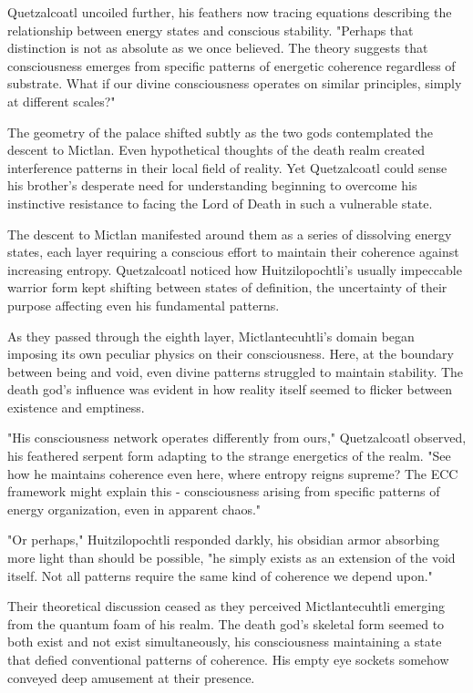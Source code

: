 Quetzalcoatl uncoiled further, his feathers now tracing equations describing the relationship between energy states and conscious stability. "Perhaps that distinction is not as absolute as we once believed. The theory suggests that consciousness emerges from specific patterns of energetic coherence regardless of substrate. What if our divine consciousness operates on similar principles, simply at different scales?"

The geometry of the palace shifted subtly as the two gods contemplated the descent to Mictlan. Even hypothetical thoughts of the death realm created interference patterns in their local field of reality. Yet Quetzalcoatl could sense his brother's desperate need for understanding beginning to overcome his instinctive resistance to facing the Lord of Death in such a vulnerable state.

The descent to Mictlan manifested around them as a series of dissolving energy states, each layer requiring a conscious effort to maintain their coherence against increasing entropy. Quetzalcoatl noticed how Huitzilopochtli's usually impeccable warrior form kept shifting between states of definition, the uncertainty of their purpose affecting even his fundamental patterns.

As they passed through the eighth layer, Mictlantecuhtli's domain began imposing its own peculiar physics on their consciousness. Here, at the boundary between being and void, even divine patterns struggled to maintain stability. The death god's influence was evident in how reality itself seemed to flicker between existence and emptiness.

"His consciousness network operates differently from ours," Quetzalcoatl observed, his feathered serpent form adapting to the strange energetics of the realm. "See how he maintains coherence even here, where entropy reigns supreme? The ECC framework might explain this - consciousness arising from specific patterns of energy organization, even in apparent chaos."

"Or perhaps," Huitzilopochtli responded darkly, his obsidian armor absorbing more light than should be possible, "he simply exists as an extension of the void itself. Not all patterns require the same kind of coherence we depend upon."

Their theoretical discussion ceased as they perceived Mictlantecuhtli emerging from the quantum foam of his realm. The death god's skeletal form seemed to both exist and not exist simultaneously, his consciousness maintaining a state that defied conventional patterns of coherence. His empty eye sockets somehow conveyed deep amusement at their presence.

